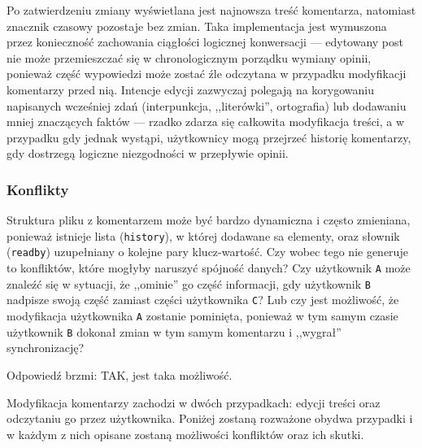 Po zatwierdzeniu zmiany wyświetlana jest najnowsza treść komentarza, natomiast znacznik czasowy pozostaje bez zmian. Taka implementacja jest wymuszona przez konieczność zachowania ciągłości logicznej konwersacji --- edytowany post nie może przemieszczać się w chronologicznym porządku wymiany opinii, ponieważ część wypowiedzi może zostać źle odczytana w przypadku modyfikacji komentarzy przed nią. Intencje edycji zazwyczaj polegają na korygowaniu napisanych wcześniej zdań (interpunkcja, ,,literówki'', ortografia) lub dodawaniu mniej znaczących faktów --- rzadko zdarza się całkowita modyfikacja treści, a w przypadku gdy jednak wystąpi, użytkownicy mogą przejrzeć historię komentarzy, gdy dostrzegą logiczne niezgodności w przepływie opinii.

\subsubsection*{Konflikty}

Struktura pliku z komentarzem może być bardzo dynamiczna i często zmieniana, ponieważ istnieje lista (\texttt{history}), w której dodawane sa elementy, oraz słownik (\texttt{readby}) uzupełniany o kolejne pary klucz-wartość. Czy wobec tego nie generuje to konfliktów, które mogłyby naruszyć spójność danych? Czy użytkownik \texttt{A} może znaleźć się w sytuacji, że ,,ominie'' go część informacji, gdy użytkownik \texttt{B} nadpisze swoją część zamiast części użytkownika \texttt{C}? Lub czy jest możliwość, że modyfikacja użytkownika \texttt{A} zostanie pominięta, ponieważ w tym samym czasie użytkownik \texttt{B} dokonał zmian w tym samym komentarzu i ,,wygrał'' synchronizację?

Odpowiedź brzmi: TAK, jest taka możliwość.

Modyfikacja komentarzy zachodzi w dwóch przypadkach: edycji treści oraz odczytaniu go przez użytkownika. Poniżej zostaną rozważone obydwa przypadki i w każdym z nich opisane zostaną możliwości konfliktów oraz ich skutki.

